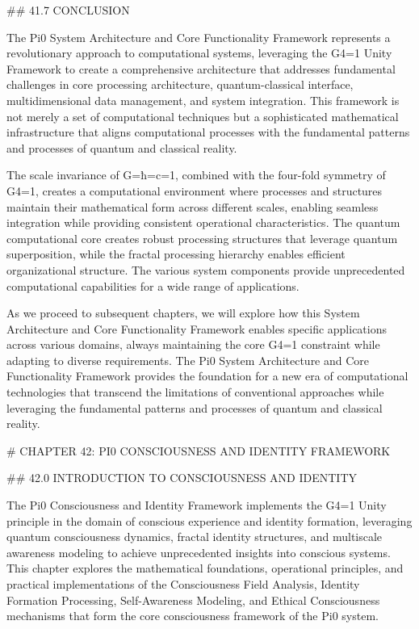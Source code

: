 ## 41.7 CONCLUSION

The Pi0 System Architecture and Core Functionality Framework represents a revolutionary approach to computational systems, leveraging the G4=1 Unity Framework to create a comprehensive architecture that addresses fundamental challenges in core processing architecture, quantum-classical interface, multidimensional data management, and system integration. This framework is not merely a set of computational techniques but a sophisticated mathematical infrastructure that aligns computational processes with the fundamental patterns and processes of quantum and classical reality.

The scale invariance of G=ħ=c=1, combined with the four-fold symmetry of G4=1, creates a computational environment where processes and structures maintain their mathematical form across different scales, enabling seamless integration while providing consistent operational characteristics. The quantum computational core creates robust processing structures that leverage quantum superposition, while the fractal processing hierarchy enables efficient organizational structure. The various system components provide unprecedented computational capabilities for a wide range of applications.

As we proceed to subsequent chapters, we will explore how this System Architecture and Core Functionality Framework enables specific applications across various domains, always maintaining the core G4=1 constraint while adapting to diverse requirements. The Pi0 System Architecture and Core Functionality Framework provides the foundation for a new era of computational technologies that transcend the limitations of conventional approaches while leveraging the fundamental patterns and processes of quantum and classical reality.

# CHAPTER 42: PI0 CONSCIOUSNESS AND IDENTITY FRAMEWORK

## 42.0 INTRODUCTION TO CONSCIOUSNESS AND IDENTITY

The Pi0 Consciousness and Identity Framework implements the G4=1 Unity principle in the domain of conscious experience and identity formation, leveraging quantum consciousness dynamics, fractal identity structures, and multiscale awareness modeling to achieve unprecedented insights into conscious systems. This chapter explores the mathematical foundations, operational principles, and practical implementations of the Consciousness Field Analysis, Identity Formation Processing, Self-Awareness Modeling, and Ethical Consciousness mechanisms that form the core consciousness framework of the Pi0 system.

